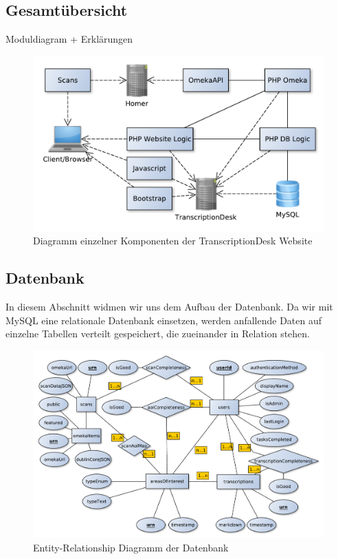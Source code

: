 \documentclass{article}
\begin{document}
\subsection{Gesamtübersicht}
Moduldiagram + Erklärungen
\\\begin{figure}[H]
\includegraphics[width=\textwidth]{../notes/components.pdf}
\caption{Diagramm einzelner Komponenten der TranscriptionDesk Website}
\label{fig:components}
\end{figure}

\subsection{Datenbank}
In diesem Abschnitt widmen wir uns dem Aufbau der Datenbank.
Da wir mit MySQL eine relationale Datenbank einsetzen,
werden anfallende Daten auf einzelne Tabellen verteilt gespeichert,
die zueinander in Relation stehen.

\begin{figure}[H]
\includegraphics[width=\textwidth]{../notes/ER.pdf}
\caption{Entity-Relationship Diagramm der Datenbank}
\label{fig:er}
\end{figure}
\end{document}
